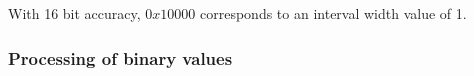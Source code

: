 \begin{informative*}
With 16 bit accuracy, $0x10000$ corresponds to an interval width value of 1.

\subsubsection{Processing of binary values}
\begin{comment}
Bits are encoded one at a time based on an estimated probability
embodied in a ``context''. As with decoding, the context simply relates to
counts of the number of zeros or ones that have been previously encoded.

A possible algorithm for encoding a single bit, given a context, is:

Encode Binary Arithmetic Coded Bit
\begin{verbatim}
write_ba(symbol, context):
    while ( ((high&0x4000)==0x0) and
           ((low&0x4000)==0x4000) ):
        code ^= 0x4000
        high ^= 0x4000
        low ^= 0x4000
        shift_bit_out()
    weight = context[0] + context[1]
    scaler = (0x10000+weight//2)//weight

    probability0 = context[0]*scaler
    range = high-low+1
    range_x_prob = (range * probability0)>>16
    if ( symbol )
        context[1] += 1
        low = low + range_x_prob
    else
        context[0] += 1
        high = low  + range_x_prob - 1
    if ( (context[0] + context[1]) > 255 ):
        #Halve counts in the context
        context[0] >> 1
        context[0] += 1
        context[1] >> 1
        context[1] += 1
    while (((high&0x8000)==0x0) and ((low&0x8000)==0x0)):
        output_bits()
        shift_bit_out()
\end{verbatim}

Shift Bit Out
\begin{verbatim}
shift_bit_out():
    high << 1
    high &= 0xFFFF
    high += 1
    low << 1
    low &= 0xFFFF
\end{verbatim}

Output Bits
\begin{verbatim}
output_bits():
    write_bit( (high&0x8000)==0x8000 )
    while ( underflow > 0 ):
        write_bit( high&0x8000)==0x0 )
        underflow -= 1
\end{verbatim}

Flush Encoder
\begin{verbatim}
flush_encoder():

    write_bit( (high&0x4000)==0x4000 )
    while ( underflow >= 0 ):
        write_bit( high&0x4000)==0x0 )
        underflow -= 1
\end{verbatim}

Where the ``write\_bit(bit)'' function outputs a single bit.
\end{comment}
\end{informative*}

